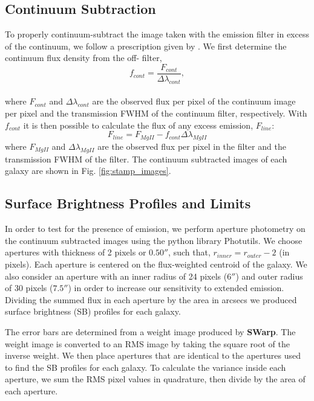 \documentclass[twocolumn]{aastex6}
\begin{document}
\subsection{Continuum Subtraction}
To properly continuum-subtract the image taken with the emission filter in excess of the continuum, we follow a prescription given by \cite{Battaia_2015}. 
We first determine the continuum flux density from the off- filter,
\begin{equation}
f_{cont}=\frac{F_{cont}}{\Delta \lambda_{cont}},
\end{equation}\\
where $F_{cont}$ and $\Delta \lambda_{cont}$ are the observed flux per pixel of the continuum image per pixel and the transmission FWHM of the continuum filter, respectively. With $f_{cont}$ it is then possible to calculate the flux of any excess emission, $F_{line}$:
\begin{equation}
F_{line}=F_{MgII}-f_{cont} \Delta \lambda_{MgII}
\label{eq:subtraction}
\end{equation}
where $F_{MgII}$ and $\Delta \lambda_{MgII}$ are the observed flux per pixel in the  filter and the transmission FWHM of the  filter. The continuum subtracted images of each galaxy are shown in Fig. \ref{fig:stamp_images}.

\subsection{Surface Brightness Profiles and Limits}

In order to test for the presence of  emission, we perform aperture photometry on the continuum subtracted images using the python library Photutils. We choose apertures with thickness of 2 pixels or $0.50 ''$, such that, $r_{inner}=r_{outer}-2$ (in pixels). Each aperture is centered on the flux-weighted centroid of the galaxy. We also consider an aperture with an inner radius of 24 pixels ($6''$) and outer radius of 30 pixels ($7.5''$) in order to increase our sensitivity to extended emission. Dividing the summed flux in each aperture by the area in arcsecs we produced surface brightness (SB) profiles for each galaxy. 

The error bars are determined from a weight image produced by \textbf{SWarp}. The weight image is converted to an RMS image by taking the square root of the inverse weight. We then place apertures that are identical to the apertures used to find the SB profiles for each galaxy. To calculate the variance inside each aperture, we sum the RMS pixel values in quadrature, then divide by the area of each aperture. 
\end{document}
